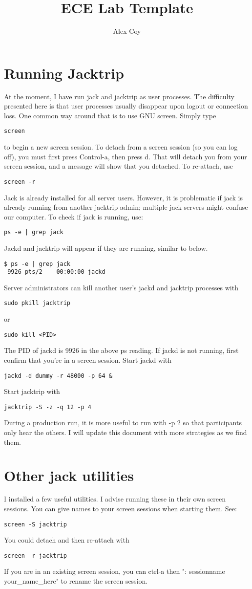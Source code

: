 \documentclass[11pt, oneside]{article}
\title{ECE Lab Template}
\author{Alex Coy}
\numberwithin{equation}{subsection}
\begin{document}
\pagestyle{fancy}

\section{Running Jacktrip}
At the moment, I have run jack and jacktrip as user processes. The difficulty
presented here is that user processes usually disappear upon logout or
connection loss. One common way around that is to use GNU screen. Simply
type
\begin{verbatim}
screen
\end{verbatim}
to begin a new screen session. To detach from a screen session (so you can
log off), you must first press Control-a, then press d. That will detach
you from your screen session, and a message will show that you detached.
To re-attach, use 
\begin{verbatim}
screen -r
\end{verbatim}

Jack is already installed for all server users. However, it is problematic
if jack is already running from another jacktrip admin; multiple jack servers
might confuse our computer. To check if jack is running, use:
\begin{verbatim}
ps -e | grep jack
\end{verbatim}
Jackd and jacktrip will appear if they are running, similar to below.
\begin{verbatim}
$ ps -e | grep jack
 9926 pts/2    00:00:00 jackd
\end{verbatim}
Server administrators can kill another user's jackd and jacktrip processes with
\begin{verbatim}
sudo pkill jacktrip
\end{verbatim}
or
\begin{verbatim}
sudo kill <PID>
\end{verbatim}
The PID of jackd is 9926 in the above ps reading.
If jackd is not running, first confirm that you're in a screen session.
Start jackd with
\begin{verbatim}
jackd -d dummy -r 48000 -p 64 &
\end{verbatim}
Start jacktrip with
\begin{verbatim}
jacktrip -S -z -q 12 -p 4
\end{verbatim}
During a production run, it is more useful to run with -p 2 so that participants
only hear the others. I will update this document with more strategies as we
find them.

\section{Other jack utilities}
I installed a few useful utilities. I advise running these in their own screen
sessions. You can give names to your screen sessions when starting them. See:
\begin{verbatim}
screen -S jacktrip
\end{verbatim}
You could detach and then re-attach with
\begin{verbatim}
screen -r jacktrip
\end{verbatim}
If you are in an existing screen session, you can ctrl-a then
": sessionname your\_name\_here" to rename the screen session.
\end{document}
